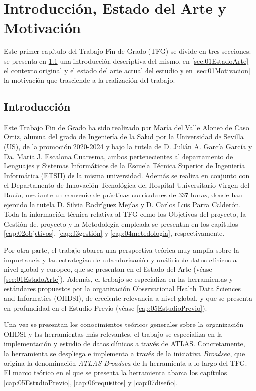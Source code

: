 \chapter{Introducción, Estado del Arte y Motivación}\label{cap:introduccion}

Este primer capítulo del Trabajo Fin de Grado (TFG) se divide en tres secciones: se presenta en \ref{sec:01Intro} una introducción descriptiva del mismo, en \ref{sec:01EstadoArte} el contexto original y el estado del arte actual del estudio y en \ref{sec:01Motivacion} la motivación que trasciende a la realización del trabajo.

\section{Introducción} \label{sec:01Intro}

Este Trabajo Fin de Grado ha sido realizado por María del Valle Alonso de Caso Ortiz, alumna del grado de Ingeniería de la Salud por la Universidad de Sevilla (US), de la promoción 2020-2024 y bajo la tutela de D. Julián A. García García y Da. Maria J. Escalona Cuaresma, ambos pertenecientes al departamento de Lenguajes y Sistemas Informáticos de la Escuela Técnica Superior de Ingeniería Informática (ETSII) de la misma universidad. Además se realiza en conjunto con el Departamento de Innovación Tecnológica del Hospital Universitario Virgen del Rocío, mediante un convenio de prácticas curriculares de 337 horas, donde han ejercido la tutela D. Silvia Rodríguez Mejías y D. Carlos Luis Parra Calderón. Toda la información técnica relativa al TFG como los Objetivos del proyecto, la Gestión del proyecto y la Metodología empleada se presentan en los capítulos \ref{cap:02objetivos}, \ref{cap:03gestión} y \ref{cap:04metodologia}, respectivamente.

Por otra parte, el trabajo abarca una perspectiva teórica muy amplia sobre la importancia y las estrategias de estandarización y análisis de datos clínicos a nivel global y europeo, que se presentan en el Estado del Arte (véase \ref{sec:01EstadoArte}). Además, el trabajo se especializa en las herramientas y estándares propuestos por la organización Observational Health Data Sciences and Informatics (OHDSI), de creciente relevancia a nivel global, y que se presenta en profundidad en el Estudio Previo (véase \ref{cap:05EstudioPrevio}).

Una vez se presentan los conocimientos teóricos generales sobre la organización OHDSI y las herramientas más relevantes, el trabajo se especializa en la implementación y estudio de datos clínicos a través de ATLAS. Concretamente, la herramienta se despliega e implementa a través de la iniciativa \textit{Broadsea}, que origina la denominación \textit{ATLAS Broadsea} de la herramienta a lo largo del TFG. El marco teórico en el que se presenta la herramienta abarca los capítulos \ref{cap:05EstudioPrevio}, \ref{cap:06requisitos} y \ref{cap:07diseño}.

